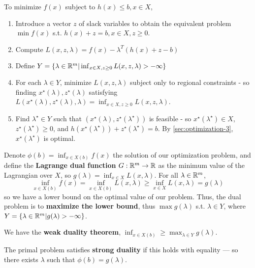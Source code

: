 \begin{thm}
  \label{sec:optimization-4}
  To minimize $f(x)$ subject to $h(x) \leq b, x \in X$,
  \begin{enumerate}
  \item Introduce a vector $z$ of slack variables to obtain the
    equivalent problem $\min f(x)$ s.t. $h(x) + z = b, x \in X, z \geq
    0$.
  \item Compute $L(x, z, \lambda) = f(x) - \lambda^{T}(h(x) + z - b)$
  \item Define $Y = \{ \lambda \in \mathbb{R}^{m} | \inf_{x \in X, z \geq 0}
    L(x, z, \lambda) > -\infty \} $
  \item For each $\lambda \in Y$, minimize $L(x, z, \lambda)$ subject
    only to regional constraints - so finding $x^{\star}(\lambda),
    z^{\star}(\lambda)$ satisfying $L(x^{\star}(\lambda),
    z^{\star}(\lambda), \lambda) = \inf_{x \in X, z \geq 0} L(x, z,
    \lambda)$.
  \item Find $\lambda^{\star} \in Y$ such that $(x^{\star}(\lambda),
    z^{\star}(\lambda^{\star}))$ is feasible - so
    $x^{\star}(\lambda^{\star}) \in X$, $z^{\star}(\lambda^{\star})
    \geq 0$, and $h(x^{\star}(\lambda^{\star})) +
    z^{\star}(\lambda^{\star}) = b$.  By \ref{sec:optimization-3},
    $x^{\star}(\lambda^{\star})$ is optimal.
  \end{enumerate}
\end{thm}

\begin{defn}
  \label{sec:optimization-5}
  Denote $\phi(b) = \inf_{x \in X(b)}f(x)$ the solution of our
  optimization problem, and define the \textbf{Lagrange dual function}
  $G: \mathbb{R}^{m} \rightarrow \mathbb{R}$ as the minimum value of the Lagrangian
  over $X$, so $g(\lambda) = \inf_{x \in X} L(x, \lambda)$. For all
  $\lambda \in \mathbb{R}^{m}$,
  \begin{equation}
    \label{eq:2}
    \inf_{x \in X(b)} f(x) = \inf_{x \in X(b)} L(x, \lambda) \geq
    \inf_{x \in X} L(x, \lambda) = g(\lambda)
  \end{equation}
  so we have a lower bound on the optimal value of our problem.  Thus,
  the dual problem is to \textbf{maximize the lower bound}, thus $\max
  g(\lambda)$ s.t. $\lambda \in Y$, where $Y = \{ \lambda \in \mathbb{R}^{m} |
g(\lambda) > -\infty \} $.
\end{defn}

\begin{thm}
  \label{sec:optimization-6}
  We have the \textbf{weak duality theorem}, 
  $\inf_{x \in X(b)} \geq \max_{\lambda \in Y} g(\lambda)$.

  The primal problem satisfies \textbf{strong duality} if this holds
  with equality --- so there exists $\lambda$ such that $\phi(b) = g(\lambda)$.
\end{thm}


